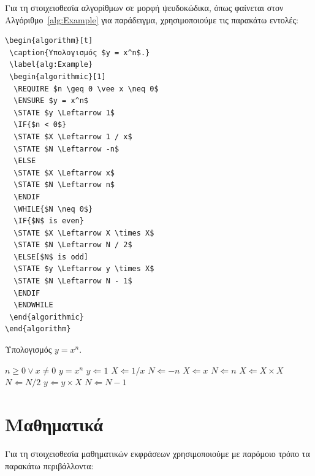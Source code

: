 Για τη στοιχειοθεσία αλγορίθμων σε μορφή ψευδοκώδικα, όπως φαίνεται στον Αλγόριθμο~\ref{alg:Example} για παράδειγμα, χρησιμοποιούμε τις παρακάτω εντολές:

\begin{verbatim}
\begin{algorithm}[t]
 \caption{Υπολογισμός $y = x^n$.}
 \label{alg:Example}
 \begin{algorithmic}[1]
  \REQUIRE $n \geq 0 \vee x \neq 0$
  \ENSURE $y = x^n$
  \STATE $y \Leftarrow 1$
  \IF{$n < 0$}
  \STATE $X \Leftarrow 1 / x$
  \STATE $N \Leftarrow -n$
  \ELSE
  \STATE $X \Leftarrow x$
  \STATE $N \Leftarrow n$
  \ENDIF
  \WHILE{$N \neq 0$}
  \IF{$N$ is even}
  \STATE $X \Leftarrow X \times X$
  \STATE $N \Leftarrow N / 2$
  \ELSE[$N$ is odd]
  \STATE $y \Leftarrow y \times X$
  \STATE $N \Leftarrow N - 1$
  \ENDIF
  \ENDWHILE
 \end{algorithmic}
\end{algorithm}
\end{verbatim}

\begin{algorithm}[t]
	\caption{Υπολογισμός $y = x^n$.}
	\label{alg:Example}
	\begin{algorithmic}[1]
		\REQUIRE $n \geq 0 \vee x \neq 0$
		\ENSURE $y = x^n$
		\STATE $y \Leftarrow 1$
		\STATE $X \Leftarrow 1 / x$
		\STATE $N \Leftarrow -n$
		\ELSE
		\STATE $X \Leftarrow x$
		\STATE $N \Leftarrow n$
		\ENDIF
		\STATE $X \Leftarrow X \times X$
		\STATE $N \Leftarrow N / 2$
		\ELSE[$N$ is odd]
		\STATE $y \Leftarrow y \times X$
		\STATE $N \Leftarrow N - 1$
		\ENDIF
		\ENDWHILE
	\end{algorithmic}
\end{algorithm}


\section{Μαθηματικά}
\label{sec:Mathematics}

Για τη στοιχειοθεσία μαθηματικών εκφράσεων χρησιμοποιούμε με παρόμοιο τρόπο τα παρακάτω περιβάλλοντα:

